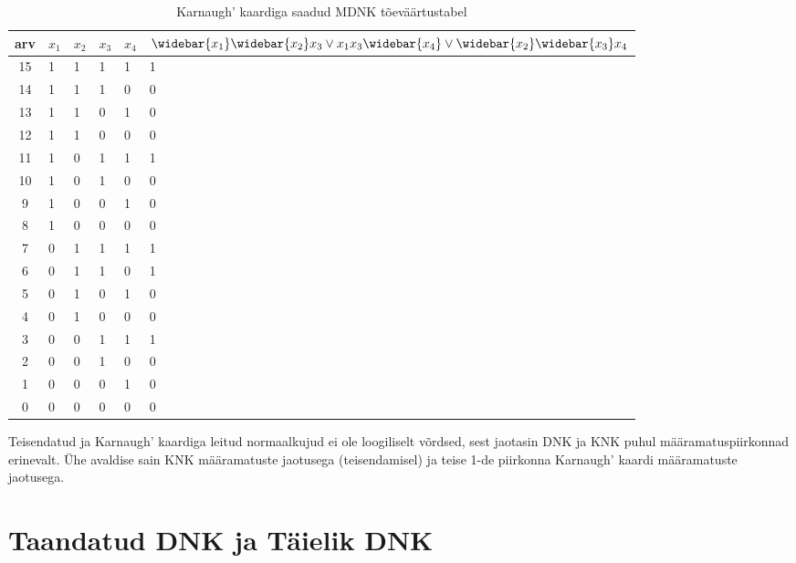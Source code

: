 \documentclass{article}
\begin{document}
\begin{table}[H]
\centering
\caption{Karnaugh' kaardiga saadud MDNK tõeväärtustabel}
\label{my-label}
\begin{tabular}{|c|l|l|l|l||l|}
\hline
arv & $x_1$ & $x_2$ & $x_3$ & $x_4$ & $\widebar{x_1}\widebar{x_2}x_3 \lor x_1x_3\widebar{x_4} \lor \widebar{x_2}\widebar{x_3}x_4$ \\\hline
15 & 1 & 1 & 1 & 1 & 1                                         \\ \hline
14 & 1 & 1 & 1 & 0 & 0                                         \\ \hline
13 & 1 & 1 & 0 & 1 & 0                                         \\ \hline
12 & 1 & 1 & 0 & 0 & 0                                         \\ \hline
11 & 1 & 0 & 1 & 1 & 1                                         \\ \hline
10 & 1 & 0 & 1 & 0 & 0                                         \\ \hline
9 & 1 & 0 & 0 & 1 & 0                                         \\ \hline
8 & 1 & 0 & 0 & 0 & 0                                         \\ \hline
7 & 0 & 1 & 1 & 1 & 1                                         \\ \hline
6 & 0 & 1 & 1 & 0 & 1                                         \\ \hline
5 & 0 & 1 & 0 & 1 & 0                                         \\ \hline
4 & 0 & 1 & 0 & 0 & 0                                         \\ \hline
3 & 0 & 0 & 1 & 1 & 1                                         \\ \hline
2 & 0 & 0 & 1 & 0 & 0                                         \\ \hline
1 & 0 & 0 & 0 & 1 & 0                                         \\ \hline
0 & 0 & 0 & 0 & 0 & 0                                         \\ \hline
\end{tabular}
\end{table}
Teisendatud ja Karnaugh' kaardiga leitud normaalkujud ei ole loogiliselt võrdsed, sest jaotasin DNK ja KNK puhul määramatuspiirkonnad erinevalt. Ühe avaldise sain KNK määramatuste jaotusega (teisendamisel) ja teise 1-de piirkonna Karnaugh' kaardi määramatuste jaotusega.
\section{Taandatud DNK ja Täielik DNK}
\end{document}
